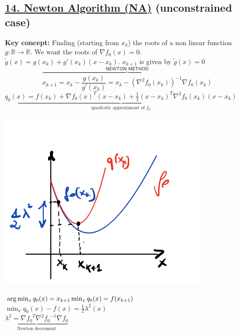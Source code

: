 \documentclass[a4paper]{article}
\begin{document}
\subsection*{\underline{14. Newton Algorithm (NA)} (\textsf{unconstrained case})}   
\vspace{-0.3cm}
\begin{multicols}{2}
    \noindent
    \textbf{Key concept:} Finding (starting from $x_k$) the roots of a non linear function $g:\mathbb{R}\to\mathbb{R}$. We want the roots of $\nabla{f_0(x)}=0$.\\
    $\tilde{g}(x)=g(x_k)+g'(x_k)(x-x_k)$. $x_{k+1}$ is given by $\tilde{g}(x)=0$
    \begin{equation}
        \overbrace{x_{k+1} = x_k - \frac{g(x_k)}{g'(x_k)} = x_k - (\nabla^2{f_0(x_k)})^{-1}\nabla{f_0(x_k)}}^{\textsf{NEWTON METHOD}} \label{eq:NM}
    \end{equation}
    {\small{$\underbrace{q_0(x)\!=\!f(x_k)\!+\!\nabla{f_0(x)}^T\!(x-x_k)\!+\!\frac{1}{2}(x-x_k)^T\nabla^2{f_0(x_k)}\!(x-x_k)}_{\text{quadratic approximant of $f_0$}}$}}
    \raggedcolumns
    \begin{multicols}{2}
        \noindent
        \begin{center}
            \includegraphics[scale=0.35]{img/newton.png}
        \end{center}
        $\arg\min_{x} q_0(x)=x_{k+1}\\
        \min_{x} {q_0(x)}=f(x_{k+1})$\\
     $\min_{x}{q_0(x)}-f(x)=\frac{1}{2}\lambda^2(x)$\\ 
     $\underbrace{\lambda^2=\nabla{f_0}^T\nabla^2{f_0}^{-1}\nabla{f_0}}_{\text{Newton decrement}}$\\

\end{multicols}
\end{multicols}
\end{document}
